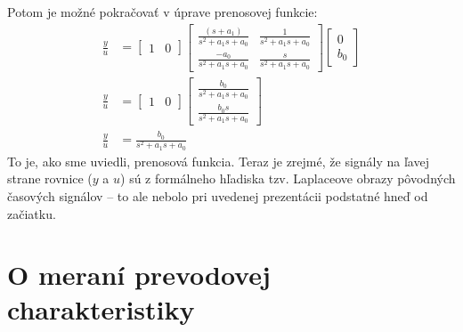 \documentclass[a4paper, 10pt, ]{article}
\begin{document}
Potom je možné pokračovať v úprave prenosovej funkcie:
\begin{subequations}
    \begin{align}
        \frac{y}{u} &=
        \begin{bmatrix} 1 & 0 \end{bmatrix}
        \begin{bmatrix} \displaystyle \frac{(s+a_1)}{s^2 + a_1 s + a_0} & \displaystyle \frac{1}{s^2 + a_1 s + a_0} \\ \displaystyle \frac{-a_0}{s^2 + a_1 s + a_0} & \displaystyle \frac{s}{s^2 + a_1 s + a_0} \end{bmatrix}
        \begin{bmatrix} 0 \\ b_0 \end{bmatrix} \\
        \frac{y}{u} &=
        \begin{bmatrix} 1 & 0 \end{bmatrix}
        \begin{bmatrix} \displaystyle \frac{b_0}{s^2 + a_1 s + a_0} \\ \displaystyle \frac{b_0 s}{s^2 + a_1 s + a_0} \end{bmatrix} \\
        \frac{y}{u} &=
        \frac{b_0}{s^2 + a_1 s + a_0}
    \end{align}
\end{subequations}
To je, ako sme uviedli, prenosová funkcia. Teraz je zrejmé, že signály na ľavej strane rovnice ($y$ a $u$) sú z formálneho hľadiska tzv. Laplaceove obrazy pôvodných časových signálov -- to ale nebolo pri uvedenej prezentácii podstatné hneď od začiatku.




























\section{O meraní prevodovej charakteristiky}

\end{document}
